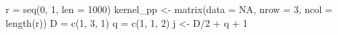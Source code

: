 \documentclass[
]{article}
\newenvironment{Shaded}{\begin{snugshade}}{\end{snugshade}}
\newcommand{\AttributeTok}[1]{\textcolor[rgb]{0.77,0.63,0.00}{#1}}
\newcommand{\ConstantTok}[1]{\textcolor[rgb]{0.00,0.00,0.00}{#1}}
\newcommand{\DecValTok}[1]{\textcolor[rgb]{0.00,0.00,0.81}{#1}}
\newcommand{\FunctionTok}[1]{\textcolor[rgb]{0.00,0.00,0.00}{#1}}
\newcommand{\NormalTok}[1]{#1}
\newcommand{\OtherTok}[1]{\textcolor[rgb]{0.56,0.35,0.01}{#1}}
\newcommand{\SpecialCharTok}[1]{\textcolor[rgb]{0.00,0.00,0.00}{#1}}
\begin{document}
\begin{Shaded}
\begin{Highlighting}[]
\NormalTok{r }\OtherTok{=} \FunctionTok{seq}\NormalTok{(}\DecValTok{0}\NormalTok{, }\DecValTok{1}\NormalTok{, }\AttributeTok{len =} \DecValTok{1000}\NormalTok{)}
\NormalTok{kernel\_pp }\OtherTok{\textless{}{-}} \FunctionTok{matrix}\NormalTok{(}\AttributeTok{data =} \ConstantTok{NA}\NormalTok{, }\AttributeTok{nrow =} \DecValTok{3}\NormalTok{, }\AttributeTok{ncol =} \FunctionTok{length}\NormalTok{(r))}
\NormalTok{D }\OtherTok{=} \FunctionTok{c}\NormalTok{(}\DecValTok{1}\NormalTok{, }\DecValTok{3}\NormalTok{, }\DecValTok{1}\NormalTok{)}
\NormalTok{q }\OtherTok{=} \FunctionTok{c}\NormalTok{(}\DecValTok{1}\NormalTok{, }\DecValTok{1}\NormalTok{, }\DecValTok{2}\NormalTok{)}
\NormalTok{j }\OtherTok{\textless{}{-}}\NormalTok{ D}\SpecialCharTok{/}\DecValTok{2} \SpecialCharTok{+}\NormalTok{ q }\SpecialCharTok{+} \DecValTok{1}


\end{Highlighting}
\end{Shaded}
\end{document}
